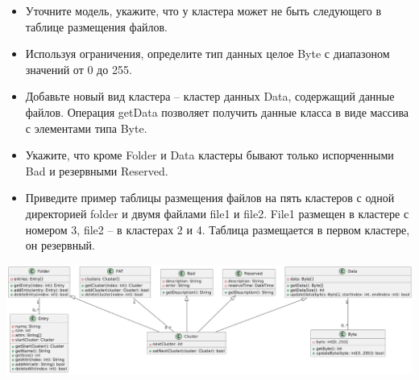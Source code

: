 \documentclass{article}
\begin{document}
\begin{itemize}
    \item Уточните модель, укажите, что у кластера может не быть следующего в таблице размещения файлов.
    \item Используя ограничения, определите тип данных целое Byte с диапазоном значений от 0 до 255.
    \item Добавьте новый вид кластера – кластер данных Data, содержащий данные файлов. Операция getData позволяет получить данные класса в виде массива с элементами типа Byte.
    \item Укажите, что кроме Folder и Data кластеры бывают только испорченными Bad и резервными Reserved. 
    \item Приведите пример таблицы размещения файлов на пять кластеров с одной директорией folder и двумя файлами file1 и file2. File1 размещен в кластере с номером 3, file2 – в кластерах 2 и 4. Таблица размещается в первом кластере, он резервный.
\end{itemize}

\includegraphics[width=\textwidth]{8.png}
\end{document}
